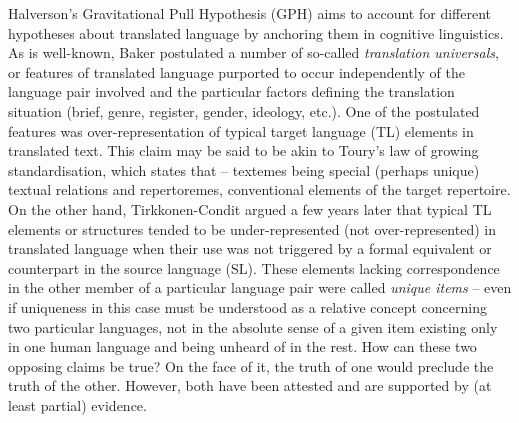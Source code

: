 \documentclass[output=paper,english,spanish,german,english]{langsci/langscibook}
\begin{document}
Halverson’s Gravitational Pull Hypothesis (GPH) aims to account for different hypotheses about translated language by anchoring them in cognitive linguistics. As is well-known, Baker \parencite*[e.g.][]{baker93} postulated a number of so-called \textit{translation universals}, or features of translated language purported to occur independently of the language pair involved and the particular factors defining the translation situation (brief, genre, register, gender, ideology, etc.). One of the postulated features was over-representation of typical target language (TL) elements in translated text. This claim may be said to be akin to Toury’s law of growing standardisation, which states that  -- textemes being special (perhaps unique) textual relations and repertoremes, conventional elements of the target repertoire. On the other hand, Tirkkonen-Condit \parencites*{tirkkonen02}{tirkkonen04} argued a few years later that typical TL elements or structures tended to be under-represented (not over-represented) in translated language when their use was not triggered by a formal equivalent or counterpart in the source language (SL). These elements lacking correspondence in the other member of a particular language pair were called \textit{unique items} -- even if uniqueness in this case must be understood as a relative concept concerning two particular languages, not in the absolute sense of a given item existing only in one human language and being unheard of in the rest. How can these two opposing claims be true? On the face of it, the truth of one would preclude the truth of the other. However, both have been attested and are supported by (at least partial) evidence.
\end{document}
